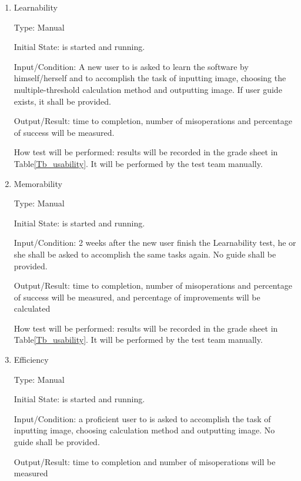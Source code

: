 \documentclass[12pt, titlepage]{article}
\begin{document}
\begin{enumerate}

\item{Learnability}

Type: Manual
					
Initial State: \progname{} is started and running.
					
Input/Condition: A new user to \progname{} is asked to learn the software by
himself/herself and to accomplish the task of inputting image, choosing the
multiple-threshold
calculation method and outputting image. If user guide exists, it shall be
provided. 
				
Output/Result: time to completion, number of misoperations and percentage of
success will be measured.
					
How test will be performed: results will be recorded in the grade sheet in
Table\ref{Tb_usability}. It will be performed by the test team manually.

\item{Memorability}

Type: Manual
					
Initial State: \progname{} is started and running.
					
Input/Condition: 2 weeks after the new user finish the Learnability test, he or
she shall be asked to accomplish the same tasks again. No guide shall be
provided.
					
Output/Result: time to completion, number of misoperations and percentage of
success will be measured, and percentage of improvements will be calculated
					
How test will be performed: results will be recorded in the grade sheet in
Table\ref{Tb_usability}. It will be performed by the test team manually.
					
\item{Efficiency}

Type: Manual
					
Initial State: \progname{} is started and running.
					
Input/Condition: a proficient user to \progname{} is asked to accomplish the
task of inputting image, choosing calculation method and outputting image. No
guide shall be provided.
					
Output/Result: time to completion and number of misoperations will be measured
					

\end{enumerate}
\end{document}
